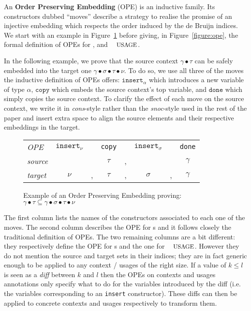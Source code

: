 \documentclass[a4paper,UKenglish]{lipics-v2016}
\begin{document}
\begin{definition}
An \textbf{Order Preserving Embedding} (OPE) is an inductive family. Its
constructors dubbed ``moves'' describe a strategy to realise the promise
of an injective embedding which respects the order induced by the de Bruijn
indices. We start with an example in Figure~\ref{figure:exampleOpe} before
giving, in Figure~\ref{figure:ope}, the formal definition of OPEs for \Nat{},
\Context{} and $\Usages{}$.
\end{definition}

In the following example, we prove that the source context $\gamma ∙ \tau$
can be safely embedded into the target one $\gamma ∙ \sigma ∙ \tau ∙ \nu$.
To do so, we use all three of the moves the inductive definition of OPEs
offers: $\texttt{insert}_{\alpha}$ which introduces a new variable of type
$\alpha$, $\texttt{copy}$ which embeds the source context's top variable,
and $\texttt{done}$ which simply copies the source context. To clarify the
effect of each move on the source context, we write it in \textit{cons}-style
rather than the \textit{snoc}-style used in the rest of the paper and insert
extra space to align the source elements and their respective embeddings in
the target.

\begin{figure}[ht]\centering
\begin{tabular}{l|ccccccc}
\textit{OPE} & $\texttt{insert}_{\nu}$ &
             & \texttt{copy} &
             & $\texttt{insert}_{\sigma}$ &
             & \texttt{done}\\
\textit{source} & & 
                & $\tau$ & , 
                & &
                & $\gamma$ \\
\textit{target} & $\nu$ & ,
                & $\tau$ & ,
                & $\sigma$ & ,
                & $\gamma$ \\
\end{tabular}
\caption{Example of an Order Preserving Embedding proving:
         $\gamma ∙ \tau
          \subseteq
          \gamma ∙ \sigma ∙ \tau ∙ \nu$\label{figure:exampleOpe}}
\end{figure}


The first column lists the names of the constructors associated to each
one of the moves. The second column describes the OPE for \Nat{}s
and it follows closely the traditional definition of OPEs. The two
remaining columns are a bit different: they respectively define the
OPE for \Context{}s and the one for $\Usages{}$. However they do not
mention the source and target sets in their indices; they are in
fact generic enough to be applied to any context / usages of the
right size. If a value of $k ≤ l$ is seen as a \emph{diff} between
$k$ and $l$ then the OPEs on contexts and usages annotations only
specify what to do for the variables introduced by the diff (i.e.
the variables corresponding to an \texttt{insert} constructor).
These diffs can then be applied to concrete contexts and usages
respectively to transform them.
\end{document}

